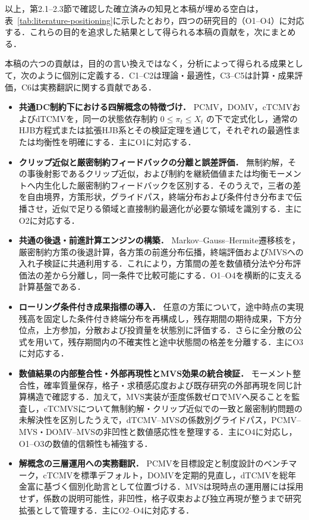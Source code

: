 \documentclass[10pt,a4paper]{article}
\theoremstyle{plain}
\theoremstyle{definition}
\begin{document}
以上，第2.1--2.3節で確認した確立済みの知見と本稿が埋める空白は，表~\ref{tab:literature-positioning}に示したとおり，四つの研究目的（O1--O4）に対応する．これらの目的を追求した結果として得られる本稿の貢献を，次にまとめる．

本稿の六つの貢献は，目的の言い換えではなく，分析によって得られる成果として，次のように個別に定義する．C1--C2は理論・最適性，C3--C5は計算・成果評価，C6は実務翻訳に関する貢献である．

\begin{itemize}[leftmargin=16mm,itemsep=4pt,topsep=4pt]
  \item[\textbf{C1}] \textbf{共通DC制約下における四解概念の特徴づけ．}
  PCMV，DOMV，cTCMVおよびdTCMVを，同一の状態依存制約 $0\leq\pi_t\leq X_t$ の下で定式化し，通常のHJB方程式または拡張HJB系とその検証定理を通じて，それぞれの最適性または均衡性を明確にする．主にO1に対応する．

  \item[\textbf{C2}] \textbf{クリップ近似と厳密制約フィードバックの分離と誤差評価．}
  無制約解，その事後射影であるクリップ近似，および制約を継続価値または均衡モーメントへ内生化した厳密制約フィードバックを区別する．そのうえで，三者の差を自由境界，方策形状，グライドパス，終端分布および条件付き分布まで伝播させ，近似で足りる領域と直接制約最適化が必要な領域を識別する．主にO2に対応する．

  \item[\textbf{C3}] \textbf{共通の後退・前進計算エンジンの構築．}
  Markov--Gauss--Hermite遷移核を，厳密制約方策の後退計算，各方策の前進分布伝播，終端評価およびMVSへの入れ子検証に共通利用する．これにより，方策間の差を数値積分法や分布評価法の差から分離し，同一条件で比較可能にする．O1--O4を横断的に支える計算基盤である．

  \item[\textbf{C4}] \textbf{ローリング条件付き成果指標の導入．}
  任意の方策について，途中時点の実現残高を固定した条件付き終端分布を再構成し，残存期間の期待成果，下方分位点，上方参加，分散および投資量を状態別に評価する．さらに全分散の公式を用いて，残存期間内の不確実性と途中状態間の格差を分離する．主にO3に対応する．

  \item[\textbf{C5}] \textbf{数値結果の内部整合性・外部再現性とMVS効果の統合検証．}
  モーメント整合性，確率質量保存，格子・求積感応度および既存研究の外部再現を同じ計算構造で確認する．加えて，MVS実装が歪度係数ゼロでMVへ戻ることを監査し，cTCMVSについて無制約解・クリップ近似での一致と厳密制約問題の未解決性を区別したうえで，dTCMV--MVSの係数別グライドパス，PCMV--MVS・DOMV--MVSの非凹性と数値感応性を整理する．主にO4に対応し，O1--O3の数値的信頼性も補強する．

  \item[\textbf{C6}] \textbf{解概念の三層運用への実務翻訳．}
  PCMVを目標設定と制度設計のベンチマーク，cTCMVを標準デフォルト，DOMVを定期的見直し，dTCMVを総年金富に基づく個別化助言として位置づける．MVSは現時点の運用層には採用せず，係数の説明可能性，非凹性，格子収束および独立再現が整うまで研究拡張として管理する．主にO2--O4に対応する．
\end{itemize}
\end{document}
